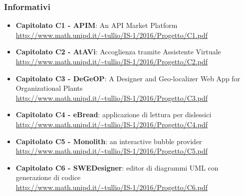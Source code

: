\subsubsection{Informativi}
\begin{itemize}
	\item \textbf{Capitolato C1 - APIM}: An API Market Platform\\ \url{http://www.math.unipd.it/~tullio/IS-1/2016/Progetto/C1.pdf}
	\item \textbf{Capitolato C2 - AtAVi}: Accoglienza tramite Assistente Virtuale\\
	\url{http://www.math.unipd.it/~tullio/IS-1/2016/Progetto/C2.pdf}
	\item \textbf{Capitolato C3 - DeGeOP}: A Designer and Geo-localizer Web App for Organizational Plants\\ \url{http://www.math.unipd.it/~tullio/IS-1/2016/Progetto/C3.pdf}
	\item \textbf{Capitolato C4 - eBread}: applicazione di lettura per dislessici\\
	\url{http://www.math.unipd.it/~tullio/IS-1/2016/Progetto/C4.pdf}
	\item \textbf{Capitolato C5 - Monolith}: an interactive bubble provider\\ \url{http://www.math.unipd.it/~tullio/IS-1/2016/Progetto/C5.pdf}
	\item \textbf{Capitolato C6 - SWEDesigner}: editor di diagrammi UML con generazione di codice\\ \url{http://www.math.unipd.it/~tullio/IS-1/2016/Progetto/C6.pdf}
\end{itemize}